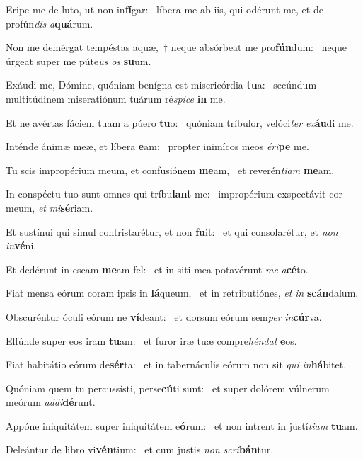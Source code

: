 \item Eripe me de luto, ut non in\textbf{fí}gar:~\psstar{} líbera me ab iis, qui odérunt me, et de profún\textit{dis} \textit{a}\textbf{quá}rum.
\item Non me demérgat tempéstas aquæ,~† neque absórbeat me pro\textbf{fún}dum:~\psstar{} neque úrgeat super me púte\textit{us} \textit{os} \textbf{su}um.
\item Exáudi me, Dómine, quóniam benígna est misericórdia \textbf{tu}a:~\psstar{} secúndum multitúdinem miseratiónum tuárum ré\textit{spice} \textbf{in} me.
\item Et ne avértas fáciem tuam a púero \textbf{tu}o:~\psstar{} quóniam tríbulor, velóci\textit{ter} \textit{ex}\textbf{áu}di me.
\item Inténde ánimæ meæ, et líbera \textbf{e}am:~\psstar{} propter inimícos meos \textit{éri}\textbf{pe} me.
\item Tu scis impropérium meum, et confusiónem \textbf{me}am,~\psstar{} et reverén\textit{tiam} \textbf{me}am.
\item In conspéctu tuo sunt omnes qui tríbu\textbf{lant} me:~\psstar{} impropérium exspectávit cor meum, \textit{et} \textit{mi}\textbf{sé}riam.
\item Et sustínui qui simul contristarétur, et non \textbf{fu}it:~\psstar{} et qui consolarétur, et \textit{non} \textit{in}\textbf{vé}ni.
\item Et dedérunt in escam \textbf{me}am fel:~\psstar{} et in siti mea potavérunt \textit{me} \textit{a}\textbf{cé}to.
\item Fiat mensa eórum coram ipsis in \textbf{lá}queum,~\psstar{} et in retributiónes, \textit{et} \textit{in} \textbf{scán}dalum.
\item Obscuréntur óculi eórum ne \textbf{ví}deant:~\psstar{} et dorsum eórum sem\textit{per} \textit{in}\textbf{cúr}va.
\item Effúnde super eos iram \textbf{tu}am:~\psstar{} et furor iræ tuæ compre\textit{héndat} \textbf{e}os.
\item Fiat habitátio eórum de\textbf{sér}ta:~\psstar{} et in tabernáculis eórum non sit \textit{qui} \textit{in}\textbf{há}bitet.
\item Quóniam quem tu percussísti, perse\textbf{cú}ti sunt:~\psstar{} et super dolórem vúlnerum meórum \textit{addi}\textbf{dé}runt.
\item Appóne iniquitátem super iniquitátem e\textbf{ó}rum:~\psstar{} et non intrent in justí\textit{tiam} \textbf{tu}am.
\item Deleántur de libro vi\textbf{vén}ti\-um:~\psstar{} et cum justis \textit{non} \textit{scri}\textbf{bán}tur.
